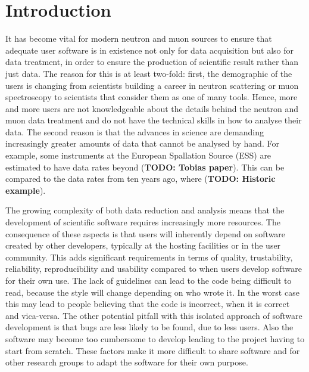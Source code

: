 \documentclass[jnr]{iosart2x}
\newcommand{\todo}[1]{\textbf{#1}}
\begin{document}
\begin{frontmatter}
\begin{keyword}
\end{keyword}

\end{frontmatter}

\newpage

\section{Introduction}
\label{Introduction}

It has become vital for modern neutron and muon sources to ensure that adequate user software is in existence not only for data acquisition but also for data treatment, in order to ensure the production of scientific result rather than just data.
The reason for this is at least two-fold: first, the demographic of the users is changing from scientists building a career in neutron scattering or muon spectroscopy to scientists that consider them as one of many tools.
Hence, more and more users are not knowledgeable about the details behind the neutron and muon data treatment and  do not have the technical skills in how to analyse their data.
The second reason is that the advances in science are demanding increasingly greater amounts of data that cannot be analysed by hand.
For example, some instruments at the
European Spallation Source (ESS) are estimated to have data rates beyond (\todo{TODO: Tobias paper}).
This can be compared to the data rates from ten years ago, where (\todo{TODO: Historic example}).

The growing complexity of both data reduction and analysis means that the development of scientific software requires increasingly more resources.
The consequence of these aspects is that users will inherently depend on software created by other developers, typically at the hosting facilities or in the user community.
This adds significant requirements in terms of quality, trustability, reliability, reproducibility and usability compared to when users develop software for their own use.
The lack of guidelines can lead to the code being difficult to read, because the style will change depending on who wrote it.
In the worst case this may lead to people believing that the code is incorrect, when it is correct and vica-versa.
The other potential pitfall with this isolated approach of software development is that bugs are less likely to be found, due to less users.
Also the software may become too cumbersome to develop leading to the project having to start from scratch.
These factors make it more difficult to share software and for other research groups to adapt the software for their own purpose.
\end{document}
